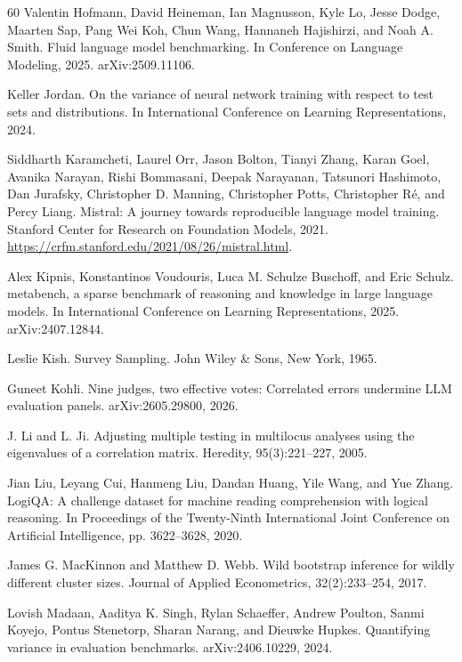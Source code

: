 \begin{thebibliography}{60}
Valentin Hofmann, David Heineman, Ian Magnusson, Kyle Lo, Jesse Dodge, Maarten Sap, Pang Wei Koh, Chun Wang, Hannaneh Hajishirzi, and Noah A. Smith. Fluid language model benchmarking. In Conference on Language Modeling, 2025. arXiv:2509.11106.

Keller Jordan. On the variance of neural network training with respect to test sets and distributions. In International Conference on Learning Representations, 2024.

Siddharth Karamcheti, Laurel Orr, Jason Bolton, Tianyi Zhang, Karan Goel, Avanika Narayan, Rishi Bommasani, Deepak Narayanan, Tatsunori Hashimoto, Dan Jurafsky, Christopher D. Manning, Christopher Potts, Christopher R\'{e}, and Percy Liang. Mistral: A journey towards reproducible language model training. Stanford Center for Research on Foundation Models, 2021. \url{https://crfm.stanford.edu/2021/08/26/mistral.html}.

Alex Kipnis, Konstantinos Voudouris, Luca M. Schulze Buschoff, and Eric Schulz. metabench, a sparse benchmark of reasoning and knowledge in large language models. In International Conference on Learning Representations, 2025. arXiv:2407.12844.

Leslie Kish. Survey Sampling. John Wiley \& Sons, New York, 1965.

Guneet Kohli. Nine judges, two effective votes: Correlated errors undermine LLM evaluation panels. arXiv:2605.29800, 2026.

J. Li and L. Ji. Adjusting multiple testing in multilocus analyses using the eigenvalues of a correlation matrix. Heredity, 95(3):221--227, 2005.

Jian Liu, Leyang Cui, Hanmeng Liu, Dandan Huang, Yile Wang, and Yue Zhang. LogiQA: A challenge dataset for machine reading comprehension with logical reasoning. In Proceedings of the Twenty-Ninth International Joint Conference on Artificial Intelligence, pp. 3622--3628, 2020.

James G. MacKinnon and Matthew D. Webb. Wild bootstrap inference for wildly different cluster sizes. Journal of Applied Econometrics, 32(2):233--254, 2017.

Lovish Madaan, Aaditya K. Singh, Rylan Schaeffer, Andrew Poulton, Sanmi Koyejo, Pontus Stenetorp, Sharan Narang, and Dieuwke Hupkes. Quantifying variance in evaluation benchmarks. arXiv:2406.10229, 2024.


\end{thebibliography}
